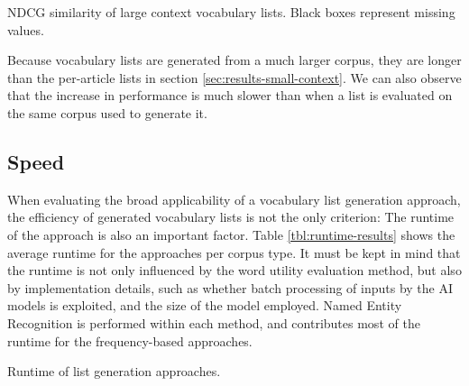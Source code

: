 \begin{table}[H]
	\centering
	\resizebox{\textwidth}{!}{%
		
	}
	\caption{NDCG similarity of large context vocabulary lists. Black boxes represent missing values.}
	\label{tbl:similarity-results-big-ndcg}
\end{table}





% 	


% 		


Because vocabulary lists are generated from a much larger corpus, they are longer than the per-article lists in section \ref{sec:results-small-context}.
We can also observe that the increase in performance is much slower than when a list is evaluated on the same corpus used to generate it.



\subsection{Speed} \label{sec:eval-speed}
When evaluating the broad applicability of a vocabulary list generation approach, the efficiency of generated vocabulary lists is not the only criterion:
The runtime of the approach is also an important factor.
Table \ref{tbl:runtime-results} shows the average runtime for the approaches per corpus type.
It must be kept in mind that the runtime is not only influenced by the word utility evaluation method, but also by implementation details, such as whether batch processing of inputs by the AI models is exploited, and the size of the model employed.
Named Entity Recognition is performed within each method, and contributes most of the runtime for the frequency-based approaches.

\begin{table}[ht]
	\centering
	
	\caption{Runtime of list generation approaches.}
	\label{tbl:runtime-results}
\end{table}

